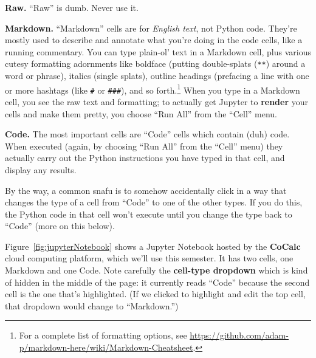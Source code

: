 \begin{description}
\item{\textbf{Raw.}} ``Raw'' is dumb. Never use it.
\item{\textbf{Markdown.}} ``Markdown'' cells are for \textit{English text}, not Python
code. They're mostly used to describe and annotate what you're doing in the
code cells, like a running commentary. You can type plain-ol' text in a
Markdown cell, plus various cutesy formatting adornments like boldface (putting
double-splats (\texttt{**}) around a word or phrase), italics (single splats),
outline headings (prefacing a line with one or more hashtags (like \texttt{\#}
or \texttt{\#\#\#}), and so forth.\footnote{For a complete list of formatting
options, see
\url{https://github.com/adam-p/markdown-here/wiki/Markdown-Cheatsheet}.} When
you type in a Markdown cell, you see the raw text and formatting; to actually get Jupyter to
\textbf{render} your cells and make them pretty, you choose ``Run All'' from
the ``Cell'' menu.

\item{\textbf{Code.}} The most important cells are ``Code'' cells which contain (duh)
code. When executed (again, by choosing ``Run All'' from the ``Cell'' menu) they actually carry out
the Python instructions you have typed in that cell, and display any results.

\end{description}

By the way, a common snafu is to somehow accidentally click in a way that
changes the type of a cell from ``Code'' to one of the other types. If you do
this, the Python code in that cell won't execute until you change the type back
to ``Code'' (more on this below).

Figure~\ref{fig:jupyterNotebook} shows a Jupyter Notebook hosted by the
\textbf{CoCalc} cloud computing platform, which we'll use this semester. It has
two cells, one Markdown and one Code. Note carefully the \textbf{cell-type
dropdown} which is kind of hidden in the middle of the page: it currently reads
``Code'' because the second cell is the one that's highlighted. (If we clicked
to highlight and edit the top cell, that dropdown would change to
``Markdown.'')

